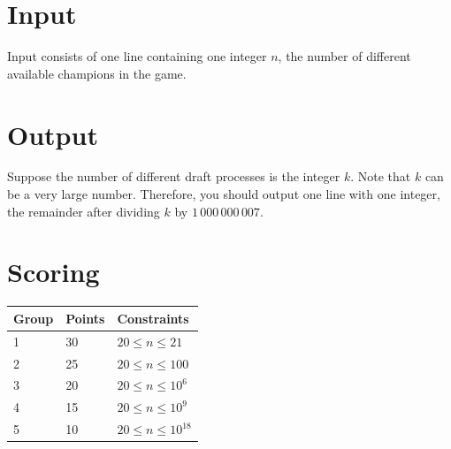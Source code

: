 \section*{Input}
Input consists of one line containing one integer $n$, the number of different available champions in the game.

\section*{Output}
Suppose the number of different draft processes is the integer $k$.
Note that $k$ can be a very large number.
Therefore, you should output one line with one integer, the remainder after dividing $k$ by $1\,000\,000\,007$.

\section*{Scoring}
\begin{tabular}{|l|l|l|}
\hline
Group & Points & Constraints \\ \hline
1     & 30     & $20 \leq n \leq 21$ \\ \hline
2     & 25     & $20 \leq n \leq 100$ \\ \hline
3     & 20     & $20 \leq n \leq 10^{6}$ \\ \hline
4     & 15     & $20 \leq n \leq 10^{9}$ \\ \hline
5     & 10     & $20 \leq n \leq 10^{18}$ \\ \hline
\end{tabular}
